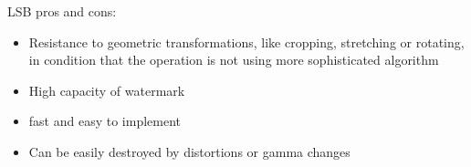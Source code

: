 \documentclass[a4paper, 12pt]{article}
\begin{document}
	LSB pros and cons:
	\begin{itemize}

		\item Resistance to geometric transformations, like cropping, stretching or rotating, in condition that the operation is not using more sophisticated algorithm
		\item High capacity of watermark
		\item fast and easy to implement
		\item Can be easily destroyed by distortions or gamma changes




	\end{itemize}

	
\end{document}
